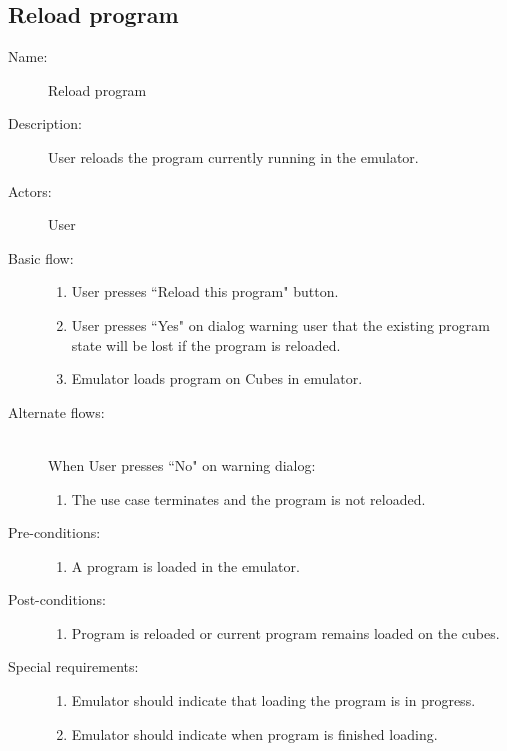 \documentclass[12pt]{article}
\begin{document}
  \subsection{Reload program}

    \begin{description}
      \item[Name:] Reload program
      \item[Description:] User reloads the program currently running in the emulator.
      \item[Actors:] User
      \item[Basic flow:] \hfill
        \begin{enumerate}
	  \item{User presses ``Reload this program" button.}
	  \item{User presses ``Yes" on dialog warning user that the existing program state will be lost if the program is reloaded.}
	  \item{Emulator loads program on Cubes in emulator.}
        \end{enumerate}
      \item[Alternate flows:] \hfill \\
	When User presses ``No" on warning dialog:
        \begin{enumerate}
          \item{The use case terminates and the program is not reloaded.}
        \end{enumerate}
      \item[Pre-conditions:] \hfill
        \begin{enumerate}
	  \item{A program is loaded in the emulator.}
        \end{enumerate}
      \item[Post-conditions:] \hfill
        \begin{enumerate}
	  \item{Program is reloaded or current program remains loaded on the cubes.}
        \end{enumerate}
      \item[Special requirements:] \hfill
        \begin{enumerate}
          \item{Emulator should indicate that loading the program is in progress.}
	  \item{Emulator should indicate when program is finished loading.}
        \end{enumerate}
    \end{description}
\end{document}
